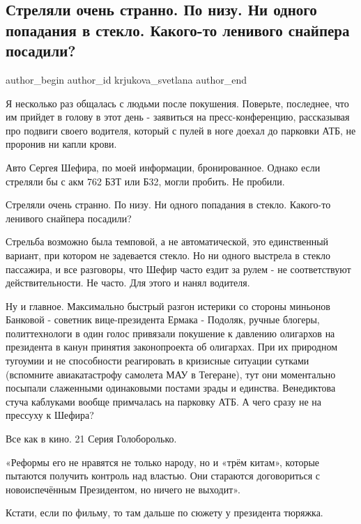  
 
 
 
 
 
\subsection{Стреляли очень странно. По низу. Ни одного попадания в стекло. Какого-то ленивого снайпера посадили?}
\label{sec:22_09_2021.fb.krjukova_svetlana.1.snajper_shefir}
 
\ifcmt
 author_begin
   author_id krjukova_svetlana
 author_end
\fi

Я несколько раз общалась с людьми после покушения. Поверьте, последнее, что им
прийдет в голову в этот день - заявиться на пресс-конференцию, рассказывая про
подвиги своего водителя, который с пулей в ноге доехал до парковки АТБ, не
проронив ни капли крови. 

Авто Сергея Шефира, по моей информации, бронированное. Однако если стреляли бы
с акм 762 БЗТ или Б32, могли пробить. Не пробили. 

Стреляли очень странно. По низу. Ни одного попадания в стекло. Какого-то
ленивого снайпера посадили?

Стрельба возможно была темповой, а не автоматической, это единственный вариант,
при котором не задевается стекло. Но ни одного выстрела в стекло пассажира, и
все разговоры, что Шефир часто ездит за рулем - не соответствуют
действительности. Не часто. Для этого и нанял водителя.

Ну и главное. Максимально быстрый разгон истерики со стороны миньонов Банковой
- советник вице-президента Ермака - Подоляк, ручные блогеры, политтехнологи в
один голос привязали покушение к давлению олигархов на президента в канун
принятия законопроекта об олигархах. При их природном тугоумии и не способности
реагировать в кризисные ситуации сутками (вспомните авиакатастрофу самолета МАУ
в Тегеране), тут они моментально посыпали слаженными одинаковыми постами зрады
и единства. Венедиктова стуча каблуками вообще примчалась на парковку АТБ. А
чего сразу не на прессуху к Шефира?

Все как в кино. 21 Серия Голоборолько.

«Реформы его не нравятся не только народу, но и «трём китам», которые пытаются
получить контроль над властью. Они стараются договориться с новоиспечённым
Президентом, но ничего не выходит». 

Кстати, если по фильму, то там дальше по сюжету у президента тюряжка.
